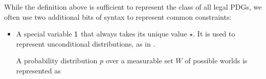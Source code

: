 \documentclass{article}
\newcommand{\bmu}{\boldsymbol{\mu}}
\newcommand{\V}{\mathcal V}
\newcommand{\N}{\mathcal N}
\newcommand{\Ed}{\mathcal E}
\newcommand{\modelnamehyper}{probabilistic dependency hypergraph}
\newcommand{\MN}{PDG}
\newcommand{\MNH}{PDH}
\newcommand{\MNs}{\MN s}
\numberwithin{equation}{section}
\begin{document}
\begin{notfocus}
%

	While the definition above is sufficient to represent the
        class of all legal \MNs,
	we often use two additional bits of syntax to represent
        common constraints:  
	\begin{itemize}
		\item A special variable $\sf 1$ that always takes its unique value $\star$. It is used to represent unconditional distributions, as in . 
		  \begin{vfull}
		\begin{examplex}\label{ex:worldsonly}
			A probability distribution $p$ over a measurable set $W$ of possible worlds is represented as 
			\begin{center}
\end{center}
\end{examplex}
\end{vfull}
\end{itemize}
\end{notfocus}
\end{document}
